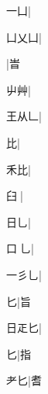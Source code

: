 \begin{multicols}{2}
{{一凵}\mktsJzrVerticalBar{}{\cjk{}{\cnsym{}　}{\cnsym{}　}{\cnsym{}　}}|{}\par
{\cjk{}凵乂凵}|{}\par
{}\mktsJzrVerticalBar{}{\cjk{}{\cnsym{}　}{\cnsym{}　}{\cnsym{}　}}|{\cjk{}旹}\par
{\cjk{}{\cnsym{}　}屮艸}\mktsJzrVerticalBar{}{\cjk{}{\cnsym{}　}{\cnsym{}　}{\cnsym{}　}}|{}\par
{\cjk{}王从{\cnxb{}𠃊}}\mktsJzrVerticalBar{}{\cjk{}{\cnsym{}　}{\cnsym{}　}{\cnsym{}　}}|{}\par
{\cjk{}{\cnsym{}　}{\cnsym{}　}比}\mktsJzrVerticalBar{}{\cjk{}{\cnsym{}　}{\cnsym{}　}{\cnsym{}　}}|{}\par
{\cjk{}{\cnsym{}　}禾比}\mktsJzrVerticalBar{}{\cjk{}{\cnsym{}　}{\cnsym{}　}{\cnsym{}　}}|{}\par
{\cjk{}{\cnsym{}　}臼{\cnjzr{}}}\mktsJzrVerticalBar{}{\cjk{}{\cnsym{}　}{\cnsym{}　}{\cnsym{}　}}|{}\par
{日乚}|{}\par
{\cjk{}口{\cnxb{}𠀉}乚}|{}\par
{\cjk{}一彡乚}|{}\par
{\cjk{}{\cnsym{}　}{\cnsym{}　}匕}\mktsJzrVerticalBar{}{\cjk{}{\cnsym{}　}{\cnsym{}　}{\cnsym{}　}}|{\cjk{}旨}\par
{\cjk{}日{\cnxb{}𤴓}匕}\mktsJzrVerticalBar{}{\cjk{}{\cnsym{}　}{\cnsym{}　}{\cnsym{}　}}|{}\par
{匕}\mktsJzrVerticalBar{}{\cjk{}{\cnsym{}　}{\cnsym{}　}{\cnsym{}　}}|{\cjk{}指}\par
{\cjk{}{\cnsym{}　}耂匕}\mktsJzrVerticalBar{}{\cjk{}{\cnsym{}　}{\cnsym{}　}{\cnsym{}　}}|{\cjk{}耆}\par
}
\end{multicols}
